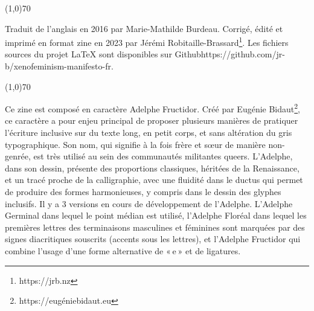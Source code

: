 \begin{center}
\line(1,0){70}
\end{center}
\singlespacing
\quote \footnotesize Traduit de l’anglais en 2016 par Marie-Mathilde Burdeau. Corrigé, édité et imprimé en format zine en 2023 par Jérémi Robitaille-Brassard\footnote{\selectfont https://jrb.nz}. Les fichiers sources du projet LaTeX sont disponibles sur Github{\selectfont https://github.com/jr-b/xenofeminism-manifesto-fr}. 

\begin{center}
\line(1,0){70}
\end{center}

\footnotesize Ce zine est composé en caractère Adelphe Fructidor. Créé par Eugénie Bidaut\footnote{\selectfont https://eugéniebidaut.eu}, ce caractère a pour enjeu principal de proposer plusieurs manières de pratiquer l’écriture inclusive sur du texte long, en petit corps, et sans altération du gris typographique. Son nom, qui signifie à la fois frère et sœur de manière non-genrée, est très utilisé au sein des communautés militantes queers. L’Adelphe, dans son dessin, présente des proportions classiques, héritées de la Renaissance, et un tracé proche de la calligraphie, avec une fluidité dans le ductus qui permet de produire des formes harmonieuses, y compris dans le dessin des glyphes inclusifs. Il y a 3 versions en cours de développement de l’Adelphe. L’Adelphe Germinal dans lequel le point médian est utilisé, l’Adelphe Floréal dans lequel les premières lettres des terminaisons masculines et féminines sont marquées par des signes diacritiques souscrits (accents sous les lettres), et l’Adelphe Fructidor qui combine l’usage d’une forme alternative de « e » et de ligatures. \\
